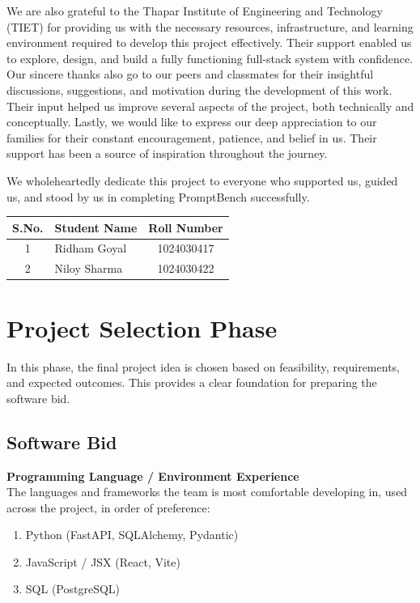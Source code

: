 \documentclass[12pt,a4paper]{report}
\begin{document}
We are also grateful to the Thapar Institute of Engineering and Technology (TIET) for providing
us with the necessary resources, infrastructure, and learning environment required to develop
this project effectively. Their support enabled us to explore, design, and build a fully
functioning full-stack system with confidence. Our sincere thanks also go to our peers and
classmates for their insightful discussions, suggestions, and motivation during the development
of this work. Their input helped us improve several aspects of the project, both technically and
conceptually. Lastly, we would like to express our deep appreciation to our families for their
constant encouragement, patience, and belief in us. Their support has been a source of
inspiration throughout the journey.

We wholeheartedly dedicate this project to everyone who supported us, guided us, and stood by us
in completing PromptBench successfully.

\vspace{1cm}

\begin{center}
\begin{tabular}{|c|l|c|}
\hline
\textbf{S.No.} & \textbf{Student Name} & \textbf{Roll Number} \\
\hline
1 & Ridham Goyal & 1024030417 \\
\hline
2 & Niloy Sharma & 1024030422 \\
\hline
\end{tabular}
\end{center}

\tableofcontents

\chapter{Project Selection Phase}

In this phase, the final project idea is chosen based on feasibility, requirements, and expected
outcomes. This provides a clear foundation for preparing the software bid.

\section{Software Bid}

\textbf{Programming Language / Environment Experience}\\
The languages and frameworks the team is most comfortable developing in, used across the project,
in order of preference:
\begin{enumerate}[nosep]
    \item Python (FastAPI, SQLAlchemy, Pydantic)
    \item JavaScript / JSX (React, Vite)
    \item SQL (PostgreSQL)
\end{enumerate}
\end{document}
